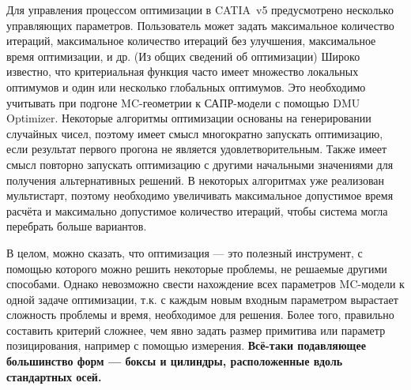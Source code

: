 Для управления процессом оптимизации в CATIA~v5 предусмотрено несколько управляющих параметров. Пользователь может задать максимальное количество итераций, максимальное количество итераций без улучшения, максимальное время оптимизации, и др. \todo
(Из общих сведений об оптимизации)
Широко известно, что критериальная функция часто имеет множество локальных оптимумов и один или несколько глобальных оптимумов. Это необходимо учитывать при подгоне MC-геометрии к САПР-модели с помощью DMU Optimizer. Некоторые алгоритмы оптимизации основаны на генерировании случайных чисел, поэтому имеет смысл многократно запускать оптимизацию, если результат первого прогона не является удовлетворительным. Также имеет смысл повторно запускать оптимизацию с другими начальными значениями для получения альтернативных решений. В некоторых алгоритмах уже реализован мультистарт, поэтому необходимо увеличивать максимальное допустимое время расчёта и максимально допустимое количество итераций, чтобы система могла перебрать больше вариантов.

В целом, можно сказать, что оптимизация --- это полезный инструмент, с помощью которого можно решить некоторые проблемы, не решаемые другими способами. Однако невозможно свести нахождение всех параметров MC-модели к одной задаче оптимизации, т.к. с каждым новым входным параметром вырастает сложность проблемы и время, необходимое для решения. Более того, правильно составить критерий сложнее, чем явно задать размер примитива или параметр позицирования, например с помощью измерения. \textbf{Всё-таки подавляющее большинство форм --- боксы и цилиндры, расположенные вдоль стандартных осей.}




